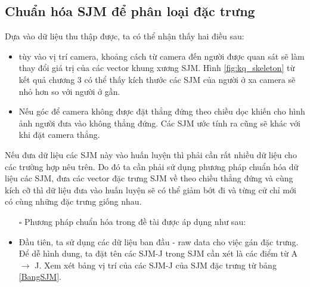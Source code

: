 \newpage

\subsection{Chuẩn hóa SJM để phân loại đặc trưng}

Dựa vào dữ liệu thu thập được, ta có thể nhận thấy hai điều sau:
\begin{itemize}
\item tùy vào vị trí camera, khoảng cách từ camera đến người được quan sát sẽ làm thay đổi giá trị của các vector khung xương SJM. Hình \ref{fig:kq_skeleton} từ kết quả chương 3 có thể thấy kích thước các SJM của người ở xa camera sẽ nhỏ hơn so với người ở gần.
\item Nếu góc để camera không được đặt thẳng đứng theo chiều dọc khiến cho hình ảnh người đưa vào không thẳng đứng. Các SJM ước tính ra cũng sẽ khác với khi đặt camera thẳng.
\end{itemize}

Nếu đưa dữ liệu các SJM này vào huấn luyện thì phải cần rất nhiều dữ liệu cho các trường hợp nêu trên. Do đó ta cần phải sử dụng phương pháp chuẩn hóa dữ liệu các SJM, đưa các vector đặc trưng SJM về theo chiều thẳng đứng và cùng kích cỡ thì dữ liệu đưa vào huấn luyện sẽ có thể giảm bớt đi và từng cử chỉ mới có cùng những đặc trưng giống nhau.
\\[2cm]
\begin{itemize}
\item[$\square$] Phương pháp chuẩn hóa trong đề tài được áp dụng như sau:
\end{itemize}
\begin{itemize}
\item Đầu tiên, ta sử dụng các dữ liệu ban đầu - raw data cho việc gán đặc trưng. Để dễ hình dung, ta đặt tên các SJM-J trong SJM cần xét là các điểm từ A $\rightarrow$ J. Xem xét bảng vị trí của các SJM-J của SJM đặc trưng từ bảng \ref{BangSJM}.
\end{itemize}

